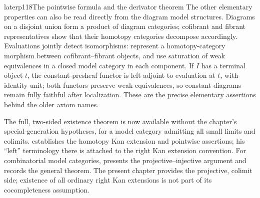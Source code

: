 \begin{dcomment}{later}{p118}{The pointwise formula and the derivator theorem}
The other elementary properties can also be read directly from the diagram model structures. Diagrams on a disjoint union form a product of diagram categories; cofibrant and fibrant representatives show that their homotopy categories decompose accordingly. Evaluations jointly detect isomorphisms: represent a homotopy-category morphism between cofibrant--fibrant objects, and use saturation of weak equivalences in a closed model category in each component. If $I$ has a terminal object $t$, the constant-presheaf functor is left adjoint to evaluation at $t$, with identity unit; both functors preserve weak equivalences, so constant diagrams remain fully faithful after localization. These are the precise elementary assertions behind the older axiom names.

The full, two-sided existence theorem is now available without the chapter's special-generation hypotheses, for a model category admitting all small limits and colimits. \citet[Theorem~6.11 and its dual]{Cisinski2003} establishes the homotopy Kan extension and pointwise assertions; his ``left'' terminology there is attached to the right Kan extension convention. For combinatorial model categories, \citet[Theorem~1.28, Proposition~1.30, and Theorem~1.32]{Groth2013} presents the projective--injective argument and records the general theorem. The present chapter provides the projective, colimit side; existence of all ordinary right Kan extensions is not part of its cocompleteness assumption.
\end{dcomment}


